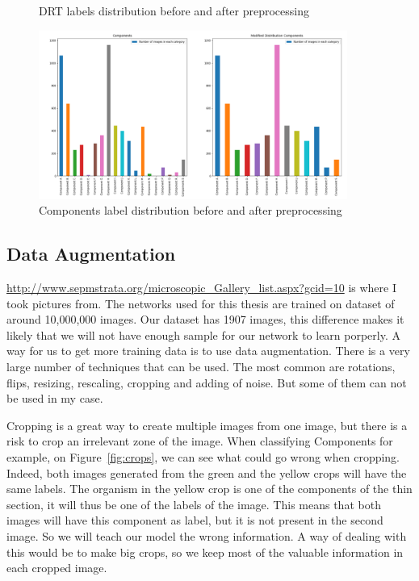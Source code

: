 \begin{figure}
\begin{minipage}{0.45\textwidth}
        \caption{DRT labels distribution before and after preprocessing}\label{fig:drt}
    \end{minipage}
    \begin{minipage}{0.45\textwidth}
        \centering
        \includegraphics[width=0.9\textwidth]{figures/03-Components.PNG} %
        \caption{Components label distribution before and after preprocessing}\label{fig:compo}
    \end{minipage}
\end{figure}

\subsection{Data Augmentation}
\url{http://www.sepmstrata.org/microscopic_Gallery_list.aspx?gcid=10} is where I took pictures from. 
The networks used for this thesis are trained on dataset of around 10,000,000 images. Our dataset has 1907 images, this difference makes it likely that we will not have enough sample for our network to learn porperly. A way for us to get more training data is to use data augmentation.  There is a very large number of techniques that can be used. The most common are rotations, flips, resizing, rescaling, cropping and adding of noise. But some of them can not be used in my case. 

Cropping is a great way to create multiple images from one image, but there is a risk to crop an irrelevant zone of the image. When classifying Components for example, on Figure~\ref{fig:crops}, we can see what could go wrong when cropping. Indeed, both images generated from the green and the yellow crops will have the same labels. The organism in the yellow crop is one of the components of the thin section, it will thus be one of the labels of the image. This means that both images will have this component as label, but it is not present in the second image. So we will teach our model the wrong information. A way of dealing with this would be to make big crops, so we keep most of the valuable information in each cropped image.  

